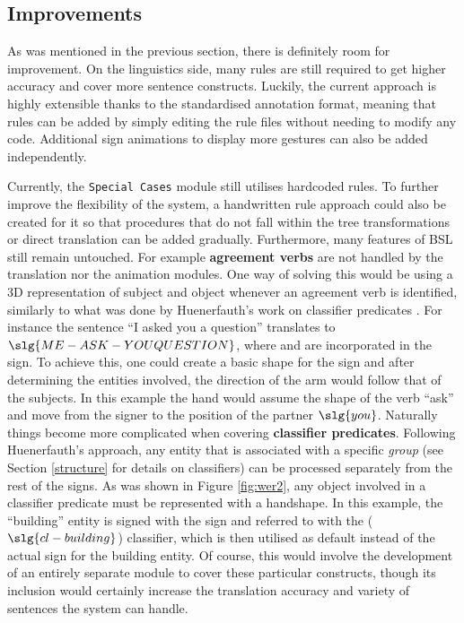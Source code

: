 \documentclass[12pt]{ociamthesis}  %
\begin{document}
\subsection{Improvements}
As was mentioned in the previous section, there is definitely room for improvement. On the linguistics side, many rules are still required to get higher accuracy and cover more sentence constructs. Luckily, the current approach is highly extensible thanks to the standardised annotation format, meaning that rules can be added by simply editing the rule files without needing to modify any code. Additional sign animations to display more gestures can also be added independently.

Currently, the \texttt{Special Cases} module still utilises hardcoded rules. To further improve the flexibility of the system, a handwritten rule approach could also be created for it so that procedures that do not fall within the tree transformations or direct translation can be added gradually. Furthermore, many features of BSL still remain untouched. For example \textbf{agreement verbs} are not handled by the translation nor the animation modules. One way of solving this would be using a 3D representation of subject and object whenever an agreement verb is identified, similarly to what was done by Huenerfauth's work on classifier predicates  . For instance the sentence ``I asked you a question'' translates to $\slg{ME-ASK-YOU QUESTION}$, where  and  are incorporated in the sign. To achieve this, one could create a basic shape for the  sign and after determining the entities involved, the direction of the arm would follow that of the subjects. In this example the hand would assume the shape of the verb ``ask'' and move from the signer  to the position of the partner $\slg{you}$. Naturally things become more complicated when covering \textbf{classifier predicates}. Following Huenerfauth's approach, any entity that is associated with a specific \textit{group} (see Section \ref{structure} for details on classifiers) can be processed separately from the rest of the signs. As was shown in Figure \ref{fig:wer2}, any object involved in a classifier predicate must be represented with a handshape. In this example, the ``building'' entity is signed with the  sign and referred to with the ($\slg{cl-building}$) classifier, which is then utilised as default instead of the actual sign for the building entity. Of course, this would involve the development of an entirely separate module to cover these particular constructs, though its inclusion would certainly increase the translation accuracy and variety of sentences the system can handle.
\end{document}
